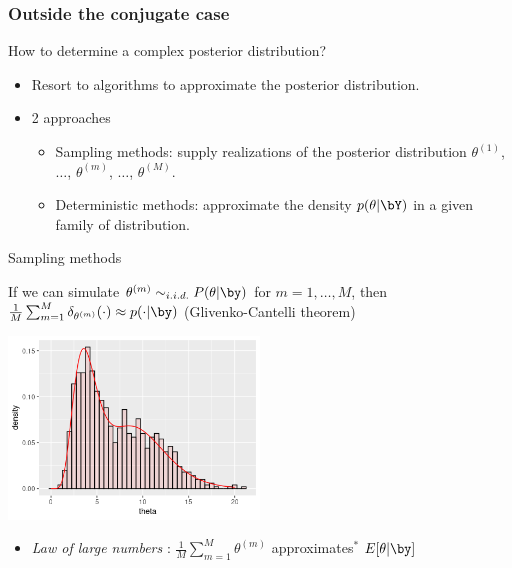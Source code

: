  

\subsubsection{Outside the conjugate case}

\begin{frame}{How to determine a complex posterior distribution?}


\begin{itemize}
 \item Resort to algorithms to approximate the posterior distribution.
 \item 2 approaches
\begin{itemize}
 \item \vert Sampling methods\noir: supply realizations of the posterior distribution $\theta^{(1)}$, $\dots$, $\theta^{(m)}$, $\dots$, $\theta^{(M)}$.
 \item \vert Deterministic methods\noir: approximate  the density $p(\theta | \bY)$ in a given family of distribution. 
\end{itemize}
\end{itemize}
\end{frame}

\begin{frame}{Sampling methods}

\begin{block}{}
If we can simulate $\theta^{(m)} \sim_{i.i.d.} P(\theta | \by)$ for $m=1,\dots, M$, then 
$\frac{1}{M} \sum_{m=1}^M \delta_{\theta^{(m)}}(\cdot) \approx p(\cdot | \by)  $
(Glivenko-Cantelli theorem)
\end{block}

\centering
\includegraphics[width = 0.5\textwidth]{figures/approx_post_MC.png}

\begin{itemize}
\item \emph{Law of large numbers} : $\frac{1}{M} \sum_{m=1}^M  \theta^{(m)}$ approximates$^*$  $E[\theta | \by]$
\end{itemize}
\end{frame}

